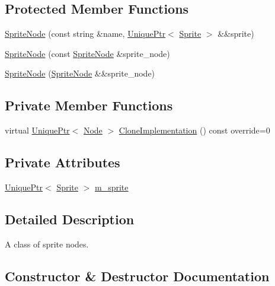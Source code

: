 \subsection*{Protected Member Functions}
\begin{DoxyCompactItemize}
\item 
\hyperlink{classmage_1_1_sprite_node_aeb75d89cf53d11ccaf83daa2a3a915a7}{Sprite\+Node} (const string \&name, \hyperlink{namespacemage_a3316d7143a973e37adf1110f2e80ca31}{Unique\+Ptr}$<$ \hyperlink{classmage_1_1_sprite}{Sprite} $>$ \&\&sprite)
\item 
\hyperlink{classmage_1_1_sprite_node_a5744942fd29d59c34820d9bb3bdd17b7}{Sprite\+Node} (const \hyperlink{classmage_1_1_sprite_node}{Sprite\+Node} \&sprite\+\_\+node)
\item 
\hyperlink{classmage_1_1_sprite_node_af57c27c8fd399eb00f46a482192f6994}{Sprite\+Node} (\hyperlink{classmage_1_1_sprite_node}{Sprite\+Node} \&\&sprite\+\_\+node)
\end{DoxyCompactItemize}
\subsection*{Private Member Functions}
\begin{DoxyCompactItemize}
\item 
virtual \hyperlink{namespacemage_a3316d7143a973e37adf1110f2e80ca31}{Unique\+Ptr}$<$ \hyperlink{classmage_1_1_node}{Node} $>$ \hyperlink{classmage_1_1_sprite_node_a83a2a865b38670d64491a1066895e218}{Clone\+Implementation} () const override=0
\end{DoxyCompactItemize}
\subsection*{Private Attributes}
\begin{DoxyCompactItemize}
\item 
\hyperlink{namespacemage_a3316d7143a973e37adf1110f2e80ca31}{Unique\+Ptr}$<$ \hyperlink{classmage_1_1_sprite}{Sprite} $>$ \hyperlink{classmage_1_1_sprite_node_a5a330abe0fe7aca40bb4ef201e1c175c}{m\+\_\+sprite}
\end{DoxyCompactItemize}


\subsection{Detailed Description}
A class of sprite nodes. 

\subsection{Constructor \& Destructor Documentation}
\hypertarget{classmage_1_1_sprite_node_a04ada795f035b935af9992a6b7a75959}{}\label{classmage_1_1_sprite_node_a04ada795f035b935af9992a6b7a75959} 
